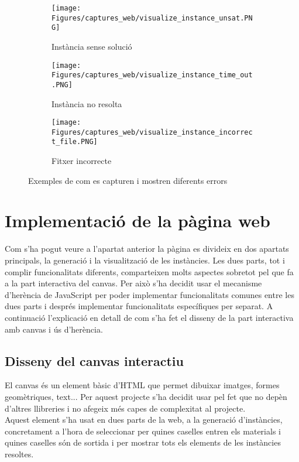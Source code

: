 \begin{figure}[H]
    \centering
    \begin{subfigure}{0.3\textwidth}
        \texttt{[image: Figures/captures\_web/visualize\_instance\_unsat.PNG]}
        \caption{Instància sense solució}
    \end{subfigure}
    \hfill
    \begin{subfigure}{0.3\textwidth}
        \texttt{[image: Figures/captures\_web/visualize\_instance\_time\_out.PNG]}
        \caption{Instància no resolta}
    \end{subfigure}
    \hfill
    \begin{subfigure}{0.3\textwidth}
        \texttt{[image: Figures/captures\_web/visualize\_instance\_incorrect\_file.PNG]}
        \caption{Fitxer incorrecte}
    \end{subfigure}
    \caption{Exemples de com es capturen i mostren diferents errors}
    \label{fig:error_caprure_web}
\end{figure}


\section{Implementació de la pàgina web}
Com s'ha pogut veure a l'apartat anterior la pàgina es divideix en dos apartats principals, la generació i la visualització de les instàncies. Les dues parts, tot i complir funcionalitats diferents, comparteixen molts aspectes sobretot pel que fa a la part interactiva del canvas. Per això s'ha decidit usar el mecanisme d'herència de JavaScript per poder implementar funcionalitats comunes entre les dues parts i després implementar funcionalitats específiques per separat. A continuació l'explicació en detall de com s'ha fet el disseny de la part interactiva amb canvas i ús d'herència.

\subsection{Disseny del canvas interactiu}
El canvas és un element bàsic d'HTML que permet dibuixar imatges, formes geomètriques, text... Per aquest projecte s'ha decidit usar pel fet que no depèn d'altres llibreries i no afegeix més capes de complexitat al projecte.\\
Aquest element s'ha usat en dues parts de la web, a la generació d'instàncies, concretament a l'hora de seleccionar per quines caselles entren els materials i quines caselles són de sortida i per mostrar tots els elements de les instàncies resoltes.\\


